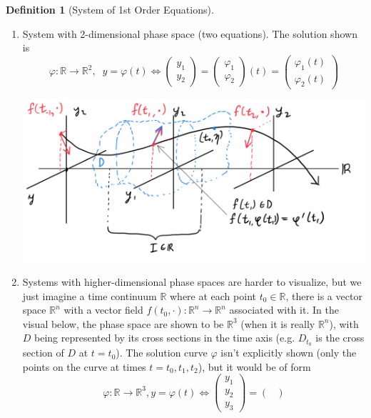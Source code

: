\documentclass{article}
\theoremstyle{remark}
\theoremstyle{definition}
\newtheorem{definition}{Definition}[section]
\begin{document}
\begin{definition}[System of 1st Order Equations]
\begin{enumerate}
\begin{center}
        \end{center}
        \item System with 2-dimensional phase space (two equations). The solution shown is 
        \[\varphi: \mathbb{R} \longrightarrow \mathbb{R}^2, \;\; y = \varphi(t) \iff \begin{pmatrix}y_1 \\ y_2
        \end{pmatrix} = \begin{pmatrix} \varphi_1 \\ \varphi_2 \end{pmatrix} (t) = \begin{pmatrix} \varphi_1 (t) \\ \varphi_2 (t) \end{pmatrix}\]
         \begin{center}
            \includegraphics[scale=0.26]{img/System_w_2_dim_Phase_Space.PNG}
        \end{center}
        \item Systems with higher-dimensional phase spaces are harder to visualize, but we just imagine a time continuum $\mathbb{R}$ where at each point $t_0 \in \mathbb{R}$, there is a vector space $\mathbb{R}^n$ with a vector field $f(t_0, \cdot): \mathbb{R}^n \longrightarrow \mathbb{R}^n$ associated with it. In the visual below, the phase space are shown to be $\mathbb{R}^3$ (when it is really $\mathbb{R}^n$), with $D$ being represented by its cross sections in the time axis (e.g. $D_{t_0}$ is the cross section of $D$ at $t=t_0$). The solution curve $\varphi$ isn't explicitly shown (only the points on the curve at times $t=t_0, t_1, t_2$), but it would be of form 
        \[\varphi: \mathbb{R} \longrightarrow \mathbb{R}^3, y = \varphi(t) \iff \begin{pmatrix}
        y_1 \\ y_2 \\ y_3 \end{pmatrix} = \begin{pmatrix}

\end{pmatrix}\]
\end{enumerate}
\end{definition}
\end{document}
